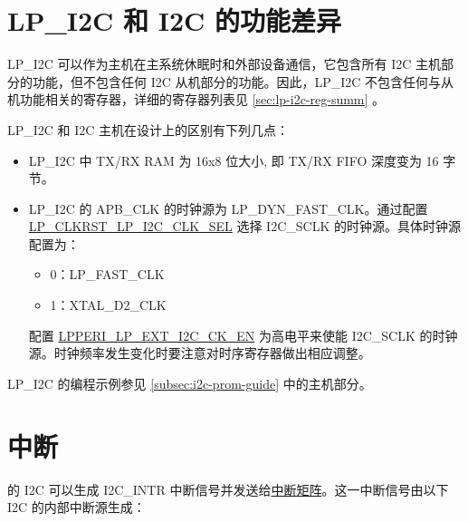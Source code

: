 \documentclass[main\_\_CN.tex]{subfiles}
\begin{document}
\section{LP\_I2C 和 I2C 的功能差异}

LP\_I2C 可以作为主机在主系统休眠时和外部设备通信，它包含所有 \chipname{} I2C 主机部分的功能，但不包含任何 \chipname{} I2C 从机部分的功能。因此，LP\_I2C 不包含任何与从机功能相关的寄存器，详细的寄存器列表见 \ref{sec:lp-i2c-reg-summ} 。

LP\_I2C 和 I2C 主机在设计上的区别有下列几点：

\begin{itemize}
    \item LP\_I2C 中 TX/RX RAM 为 16x8 位大小, 即 TX/RX FIFO 深度变为 16 字节。
    \item LP\_I2C 的 APB\_CLK 的时钟源为 LP\_DYN\_FAST\_CLK。通过配置 \hyperref[fielddesc:LPCLKRSTLPI2CCLKSEL]{LP\_CLKRST\_LP\_I2C\_CLK\_SEL} 选择 I2C\_SCLK 的时钟源。具体时钟源配置为：
    \begin{itemize}
        \item 0：LP\_FAST\_CLK
        \item 1：XTAL\_D2\_CLK
    \end{itemize}
    配置 \hyperref[fielddesc:LPPERILPEXTI2CCKEN]{LPPERI\_LP\_EXT\_I2C\_CK\_EN} 为高电平来使能 I2C\_SCLK 的时钟源。时钟频率发生变化时要注意对时序寄存器做出相应调整。
\end{itemize}

LP\_I2C 的编程示例参见 \ref{subsec:i2c-prom-guide} 中的主机部分。


\section{中断}
\label{sub:i2c-int}

\chipname{} 的 I2C 可以生成 I2C\_INTR 中断信号并发送给\hyperref[mod:intmtrx]{中断矩阵}。这一中断信号由以下 I2C 的内部中断源生成：
\end{document}
